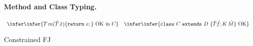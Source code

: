 \documentclass[nocopyrightspace,preprint,10pt]{sigplanconf}
\def\from#1\infer#2{{{\textstyle #1}\over{\textstyle #2}}}
\def\subtype{\sqsubseteq}
\begin{document}
\begin{table}
\paragraph{Method and Class Typing.}
$$
\begin{array}{ll}
\from{
  \begin{array}{l}
    \bar{T}\ \bar{x}, C\ \this \vdash S\ e   \\
    \bar{T}\ \bar{x}, C\ \this \vdash S \subtype T   \\
  \end{array}}
\infer{T\,m(\bar{T}\,\bar{x})\{\return\ e;\}\ \mbox{OK in}\ C} &
\from{
  \begin{array}{l}
    K=C(\bar{S}\,\bar{g},\bar{T}\,\bar{f})\{\super(\bar{g});\this.\bar{f}=\bar{f};\}\\
    D \rhd \bar{S}\ \bar{g}\ \\ 
    \bar{M}\ \mbox{OK in}\ C\\
  \end{array}}
\infer{\class\ C\ \extends\ D\ \{\bar{T}\bar{f};K\,\bar{M}\}\ \mbox{OK}} 
\end{array}
$$

\caption{Constrained FJ}\label{FJ-Table}
\end{table}
\end{document}
